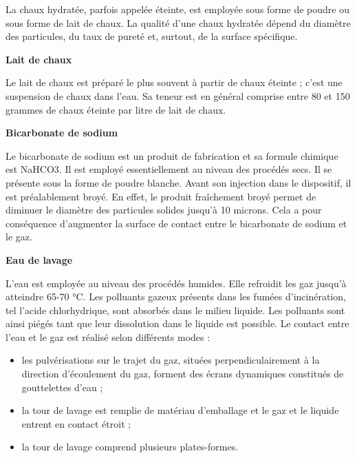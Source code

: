 La chaux hydratée, parfois appelée éteinte, est employée sous forme de poudre ou sous forme de lait de chaux.
La qualité d’une chaux hydratée dépend du diamètre des particules, du taux de pureté et, surtout, de la surface spécifique.


\vspace{0.3cm}
\textbf{Lait de chaux}
\vspace{0.3cm}

Le lait de chaux est préparé le plus souvent à partir de chaux éteinte ; c’est une suspension de chaux dans l’eau. Sa teneur est en général comprise entre 80 et 150 grammes de chaux éteinte par litre de lait de chaux.

\vspace{0.3cm}
\textbf{Bicarbonate de sodium}
\vspace{0.3cm}

Le bicarbonate de sodium est un produit de fabrication et sa formule chimique est NaHCO3.
Il est employé essentiellement au niveau des procédés secs.
Il se présente sous la forme de poudre blanche. Avant son injection dans le dispositif, il est préalablement broyé. En effet, le produit fraîchement broyé permet de diminuer le diamètre des particules solides jusqu’à 10 microns. Cela a pour conséquence d’augmenter la surface de contact entre le bicarbonate de sodium et le gaz.


\vspace{0.3cm}
\textbf{Eau de lavage}
\vspace{0.3cm}

L’eau est employée au niveau des procédés humides. 
Elle refroidit les gaz jusqu’à atteindre 65-70 °C. Les polluants gazeux présents dans les fumées d’incinération, tel l’acide chlorhydrique, sont absorbés dans le milieu liquide. Les polluants sont ainsi piégés tant que leur dissolution dans le liquide est possible.
Le contact entre l’eau et le gaz est réalisé selon différents modes :



\begin{itemize}
\item les pulvérisations sur le trajet du gaz, situées perpendiculairement à la direction d'écoulement du gaz, forment des écrans dynamiques constitués de gouttelettes d'eau ;
\item la tour de lavage est remplie de matériau d'emballage et le gaz et le liquide entrent en contact étroit ;
\item la tour de lavage comprend plusieurs plates-formes.
\end{itemize}

